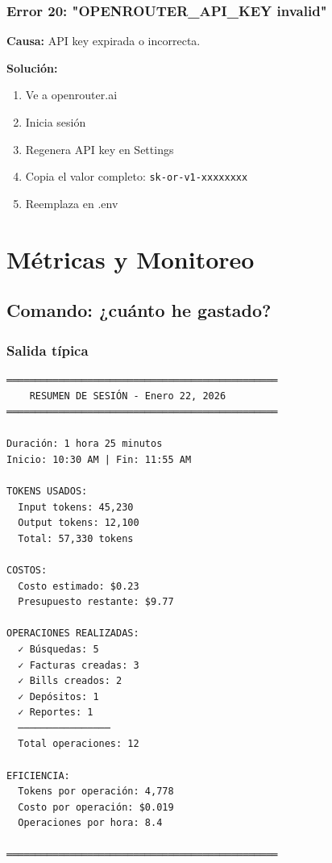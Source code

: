\documentclass[12pt,oneside]{article}
\begin{document}
\subsubsection{Error 20: "OPENROUTER_API_KEY invalid"}

\textbf{Causa:} API key expirada o incorrecta.

\textbf{Solución:}
\begin{enumerate}
    \item Ve a openrouter.ai
    \item Inicia sesión
    \item Regenera API key en Settings
    \item Copia el valor completo: \texttt{sk-or-v1-xxxxxxxx}
    \item Reemplaza en .env
\end{enumerate}

\newpage

\section{Métricas y Monitoreo}

\subsection{Comando: ¿cuánto he gastado?}

\subsubsection{Salida típica}

\begin{verbatim}
═══════════════════════════════════════════════
    RESUMEN DE SESIÓN - Enero 22, 2026
═══════════════════════════════════════════════

Duración: 1 hora 25 minutos
Inicio: 10:30 AM | Fin: 11:55 AM

TOKENS USADOS:
  Input tokens: 45,230
  Output tokens: 12,100
  Total: 57,330 tokens

COSTOS:
  Costo estimado: $0.23
  Presupuesto restante: $9.77

OPERACIONES REALIZADAS:
  ✓ Búsquedas: 5
  ✓ Facturas creadas: 3
  ✓ Bills creados: 2
  ✓ Depósitos: 1
  ✓ Reportes: 1
  ────────────────
  Total operaciones: 12

EFICIENCIA:
  Tokens por operación: 4,778
  Costo por operación: $0.019
  Operaciones por hora: 8.4

═══════════════════════════════════════════════
\end{verbatim}
\end{document}
